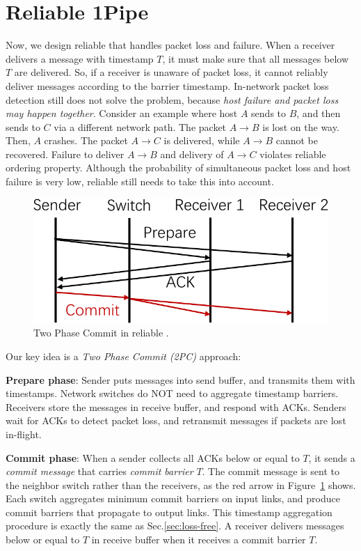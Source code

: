 \section{Reliable 1Pipe}
\label{sec:reliable}

Now, we design reliable \sys{} that handles packet loss and failure.
When a receiver delivers a message with timestamp $T$, it must make sure that all messages below $T$ are delivered.
So, if a receiver is unaware of packet loss, it cannot reliably deliver messages according to the barrier timestamp.
In-network packet loss detection still does not solve the problem, because \emph{host failure and packet loss may happen together}.
Consider an example where host $A$ sends to $B$, and then sends to $C$ via a different network path. The packet $A \rightarrow B$ is lost on the way. Then, $A$ crashes. The packet $A \rightarrow C$ is delivered, while $A \rightarrow B$ cannot be recovered. Failure to deliver $A \rightarrow B$ and delivery of $A \rightarrow C$ violates reliable ordering property.
Although the probability of simultaneous packet loss and host failure is very low, reliable \sys{} still needs to take this into account.


\begin{figure}[t]
\centering
	\includegraphics[width=.3\textwidth]{images/2PC.pdf}
	\caption{Two Phase Commit in reliable \sys{}.}
	\label{fig:2PC}
\end{figure}

Our key idea is a \emph{Two Phase Commit (2PC)} approach:

\begin{ecompact}
\item \textbf{Prepare phase}: Sender puts messages into send buffer, and transmits them with timestamps. Network switches do NOT need to aggregate timestamp barriers. Receivers store the messages in receive buffer, and respond with ACKs. Senders wait for ACKs to detect packet loss, and retransmit messages if packets are lost in-flight.
\item \textbf{Commit phase}: When a sender collects all ACKs below or equal to $T$, it sends a \emph{commit message} that carries \emph{commit barrier} $T$. The commit message is sent to the neighbor switch rather than the receivers, as the red arrow in Figure~\ref{fig:2PC} shows. Each switch aggregates minimum commit barriers on input links, and produce commit barriers that propagate to output links. This timestamp aggregation procedure is exactly the same as Sec.\ref{sec:loss-free}. A receiver delivers messages below or equal to $T$ in receive buffer when it receives a commit barrier $T$.
\end{ecompact}



